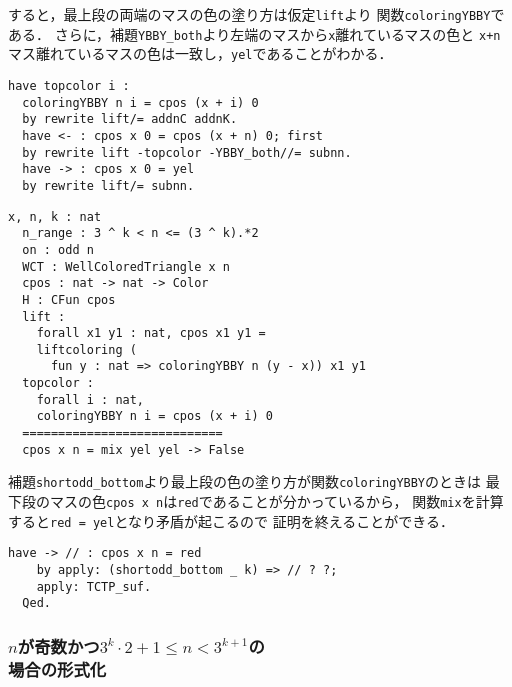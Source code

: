 すると，最上段の両端のマスの色の塗り方は仮定{\tt{lift}}より
関数{\tt{coloringYBBY}}である．
さらに，補題{\tt{YBBY\_both}}より左端のマスから{\tt{x}}離れているマスの色と
{\tt{x+n}}マス離れているマスの色は一致し，{\tt{yel}}であることがわかる．
\begin{lstlisting}[language=Coq]
  have topcolor i :
  coloringYBBY n i = cpos (x + i) 0
  by rewrite lift/= addnC addnK.
  have <- : cpos x 0 = cpos (x + n) 0; first
  by rewrite lift -topcolor -YBBY_both//= subnn.
  have -> : cpos x 0 = yel
  by rewrite lift/= subnn.
\end{lstlisting}
\begin{lstlisting}[language=Coq]
  x, n, k : nat
  n_range : 3 ^ k < n <= (3 ^ k).*2
  on : odd n
  WCT : WellColoredTriangle x n
  cpos : nat -> nat -> Color
  H : CFun cpos
  lift :
    forall x1 y1 : nat, cpos x1 y1 =
    liftcoloring (
      fun y : nat => coloringYBBY n (y - x)) x1 y1
  topcolor :
    forall i : nat,
    coloringYBBY n i = cpos (x + i) 0
  ============================
  cpos x n = mix yel yel -> False
\end{lstlisting}
補題{\tt{shortodd\_bottom}}より最上段の色の塗り方が関数{\tt{coloringYBBY}}のときは
最下段のマスの色{\tt{cpos x n}}は{\tt{red}}であることが分かっているから，
関数{\tt{mix}}を計算すると{\tt{red = yel}}となり矛盾が起こるので
証明を終えることができる．
\begin{lstlisting}[language=Coq]
    have -> // : cpos x n = red
    by apply: (shortodd_bottom _ k) => // ? ?;
    apply: TCTP_suf.
  Qed.
\end{lstlisting}

\subsubsection{$n$が奇数かつ$3^{k} \cdot 2 + 1 \leq n < 3^{k+1}$の\\場合の形式化}

